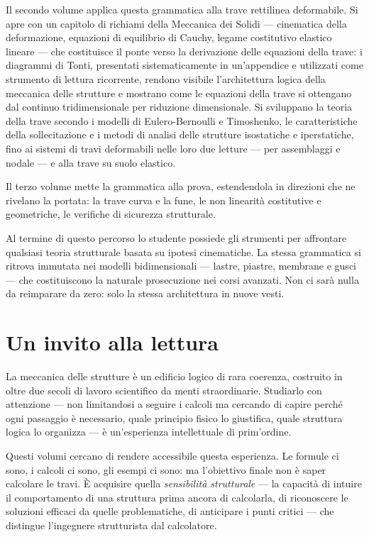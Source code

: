 Il secondo volume applica questa grammatica alla trave
rettilinea deformabile. Si apre con un capitolo di richiami
della Meccanica dei Solidi --- cinematica della deformazione,
equazioni di equilibrio di Cauchy, legame costitutivo
elastico lineare --- che costituisce il ponte verso la
derivazione delle equazioni della trave: i diagrammi di
Tonti, presentati sistematicamente in un'appendice e
utilizzati come strumento di lettura ricorrente, rendono
visibile l'architettura logica della meccanica delle strutture
e mostrano come le equazioni della trave si ottengano dal
continuo tridimensionale per riduzione dimensionale. Si
sviluppano la teoria della trave secondo i modelli di
Eulero-Bernoulli e Timoshenko, le caratteristiche della
sollecitazione e i metodi di analisi delle strutture
isostatiche e iperstatiche, fino ai sistemi di travi
deformabili nelle loro due letture --- per assemblaggi e
nodale --- e alla trave su suolo elastico.

Il terzo volume mette la grammatica alla prova, estendendola
in direzioni che ne rivelano la portata: la trave curva e la
fune, le non linearità costitutive e geometriche, le
verifiche di sicurezza strutturale.



Al termine di questo percorso lo studente possiede gli strumenti per affrontare qualsiasi teoria strutturale basata su ipotesi cinematiche. La stessa grammatica si ritrova immutata nei modelli bidimensionali --- lastre, piastre, membrane e gusci --- che costituiscono la naturale prosecuzione nei corsi avanzati. Non ci sarà nulla da reimparare da zero: solo la stessa architettura in nuove vesti.

\section*{Un invito alla lettura}

La meccanica delle strutture è un edificio logico di rara coerenza, costruito in oltre due secoli di lavoro scientifico da menti straordinarie. Studiarlo con attenzione --- non limitandosi a seguire i calcoli ma cercando di capire perché ogni passaggio è necessario, quale principio fisico lo giustifica, quale struttura logica lo organizza --- è un'esperienza intellettuale di prim'ordine.

Questi volumi cercano di rendere accessibile questa esperienza. Le formule ci sono, i calcoli ci sono, gli esempi ci sono: ma l'obiettivo finale non è saper calcolare le travi. È acquisire quella \textit{sensibilità strutturale} --- la capacità di intuire il comportamento di una struttura prima ancora di calcolarla, di riconoscere le soluzioni efficaci da quelle problematiche, di anticipare i punti critici --- che distingue l'ingegnere strutturista dal calcolatore.

